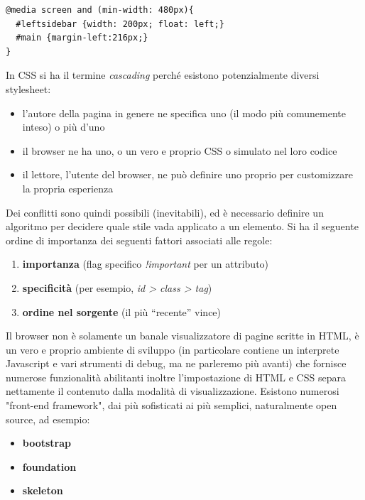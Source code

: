 \documentclass[a4paper,12pt, oneside]{book}
\begin{document}
\begin{verbatim}
@media screen and (min-width: 480px){
  #leftsidebar {width: 200px; float: left;}
  #main {margin-left:216px;}
}
\end{verbatim}
In CSS si ha il termine \textit{cascading} perché esistono potenzialmente diversi stylesheet:
\begin{itemize}
	\item l'autore della pagina in genere ne specifica uno (il modo più comunemente inteso) o più d'uno
	\item il browser ne ha uno, o un vero e proprio CSS o simulato nel loro codice
	\item il lettore, l’utente del browser, ne può definire uno proprio per customizzare la propria esperienza
\end{itemize}
Dei conflitti sono quindi possibili (inevitabili), ed è necessario definire un algoritmo per decidere quale stile vada applicato a un elemento. Si ha il seguente ordine di importanza dei seguenti fattori associati alle regole:
\begin{enumerate}
	\item \textbf{importanza} (flag specifico \textit{!important} per un attributo)
	\item \textbf{specificità} (per esempio, \textit{id > class > tag})
	\item \textbf{ordine nel sorgente }(il più “recente” vince)
\end{enumerate}
Il browser non è solamente un banale visualizzatore di pagine
scritte in HTML, è un vero e proprio ambiente di sviluppo (in
particolare contiene un interprete Javascript e vari strumenti di debug, ma ne parleremo più avanti) che fornisce numerose funzionalità abilitanti inoltre l'impostazione di HTML e CSS separa nettamente il contenuto
dalla modalità di visualizzazione. Esistono numerosi "front-end framework", dai più sofisticati ai
più semplici, naturalmente open
source, ad esempio:
\begin{itemize}
	\item \textbf{bootstrap}
	\item \textbf{foundation}
	\item \textbf{skeleton}
\end{itemize}
\end{document}
